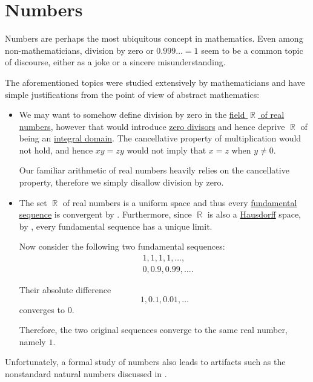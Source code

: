 \section{Numbers}\label{sec:numbers}

Numbers are perhaps the most ubiquitous concept in mathematics. Even among non-mathematicians, division by zero or \( 0.999\ldots = 1 \) seem to be a common topic of discourse, either as a joke or a sincere misunderstanding.

The aforementioned topics were studied extensively by mathematicians and have simple justifications from the point of view of abstract mathematics:
\begin{itemize}
  \item We may want to somehow define division by zero in the \hyperref[def:set_of_real_numbers]{field \( \BbbR \) of real numbers}, however that would introduce \hyperref[def:divisibility/zero]{zero divisors} and hence deprive \( \BbbR \) of being an \hyperref[def:integral_domain]{integral domain}. The cancellative property of multiplication would not hold, and hence \( xy = zy \) would not imply that \( x = z \) when \( y \neq 0 \).

  Our familiar arithmetic of real numbers heavily relies on the cancellative property, therefore we simply disallow division by zero.

  \item The set \( \BbbR \) of real numbers is a uniform space and thus every \hyperref[def:fundamental_net]{fundamental sequence} is convergent by . Furthermore, since \( \BbbR \) is also a \hyperref[def:separation_axioms/T2]{Hausdorff} space, by , every fundamental sequence has a unique limit.

  Now consider the following two fundamental sequences:
  \begin{align*}
    &1, 1, 1, 1, \ldots, \\
    &0, 0.9, 0.99, \ldots.
  \end{align*}

  Their absolute difference
  \begin{equation*}
    1, 0.1, 0.01, \ldots
  \end{equation*}
  converges to \( 0 \).

  Therefore, the two original sequences converge to the same real number, namely \( 1 \).
\end{itemize}

Unfortunately, a formal study of numbers also leads to artifacts such as the nonstandard natural numbers discussed in .

